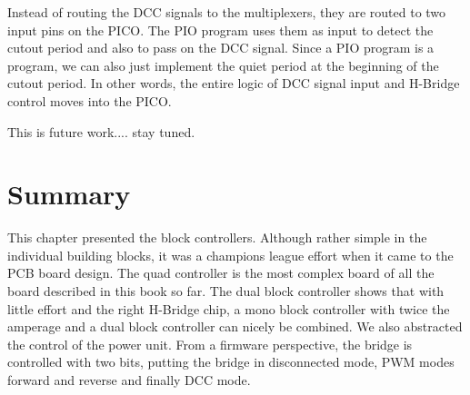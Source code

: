 Instead of routing the DCC signals to the multiplexers, they are routed to two input pins on the PICO. The PIO program uses them as input to detect the cutout period and also to pass on the DCC signal. Since a PIO program is a program, we can also just implement the quiet period at the beginning of the cutout period. In other words, the entire logic of DCC signal input and H-Bridge control moves into the PICO. 

This is future work.... stay tuned.

\section{Summary}

This chapter presented the block controllers. Although rather simple in the individual building blocks, it was a champions league effort when it came to the PCB board design. The quad controller is the most complex board of all the board described in this book so far. The dual block controller shows that with little effort and the right H-Bridge chip, a mono block controller with twice the amperage and a dual block controller can nicely be combined. We also abstracted the control of the power unit. From a firmware perspective, the bridge is controlled with two bits, putting the bridge in disconnected mode, PWM modes forward and reverse and finally DCC mode.

